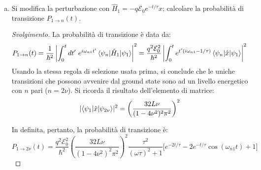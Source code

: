 \documentclass[11pt, a4paper]{scrartcl} %
\numberwithin{equation}{subsection}
\theoremstyle{style2}
\theoremstyle{style1}
\renewcommand\qedsymbol{$\blacksquare$}
\newenvironment{svolgimento}{\renewcommand\qedsymbol{$\spadesuit$}\begin{proof}[Svolgimento]}{\end{proof}}
\begin{document}
\begin{enumerate}[(a).]
\begin{svolgimento}
			Per il secondo ordine, invece, si calcola
			\[
			E^{(2)} _1 = \sum_{n>1}^{} \frac{\left\lvert \Braket{\psi _n(x)|\hat{H}_1|\psi _1(x)}  \right\rvert ^2}{E_1^{(0)} - E^{(0)} _n} 
			\] 
	Visto che $\psi _1(x)$ \`e pari, la regole di selezione per l'elemento di matrice \`e che sia $n$ pari, cos\`i il seno in $\psi _n(x)$ compensa la disparit\`a dell'integrando $x \psi _1(x)$.
	Allora la correzione al secondo ordine sar\`a della forma 
	\[
	E^{(2)} _1 = \sum_{\nu =1}^{+\infty}  \frac{\left\lvert \Braket{\psi _{2\nu } (x)|\hat{H}_1|\psi _1(x)}  \right\rvert ^2}{E_1^{(0)} - E^{(0)} _{2\nu } }
	\] 
Ciascun elemento di matrice, allora, si pu\`o calcolare com segue:
\[
\begin{split}
	\braket{\psi _1 |\hat{H}_1|\psi _{2\nu } }&= - q \mathcal{E}  \braket{\psi _1|\hat{x}|\psi _{2\nu } } = - \frac{q\mathcal{E} }{4 L} \int_{-L} ^{+L} dx \left[ e^{\frac{i \pi x}{2L}} + e^{- \frac{i\pi x}{2L}}  \right] x \left[ e^{\frac{i \pi x\nu }{L}} - e^{\frac{-i \pi x \nu }{L}}  \right] \\
						  &= (-1)^{\nu } q \mathcal{E} \frac{32i L \nu }{(1-4\nu ^2)^2 \pi^2}
\end{split}
\] 
Da questo, si pu\`o calcolare la correzione al secondo ordine, che ammette un risultato finito alla serie.
		\end{svolgimento}
	\item Si modifica la perturbazione con $\hat{H}_1 = -q \mathcal{E} _0 e^{-t / \tau } x$; calcolare la probabilit\`a di transizione $P_{1\to n} (t)$.
		\begin{svolgimento}
			   La probabilit\`a di transizione \`e data da:
			   \[
			   P_{1\to n}  (t) = \frac{1}{\hbar ^2} \left\lvert  \int_{0} ^t dt' \ e^{i\omega_{n1} t'} \braket{\psi _n |\hat{H}_1|\psi _1}  \right\rvert ^2 = \frac{q^2 \mathcal{E} _0^2}{\hbar ^2} \left\lvert \int_{0} ^t e^{t' (i\omega_{n1} -1 / \tau ) } \braket{\psi _n|\hat{x}|\psi _1}  \right\rvert ^2
			   \] 
			   Usando la stessa regola di selezione usata prima, si conclude che le uniche transizioni che possono avvenire dal ground state sono ad un livello energetico con $n$ pari ($n = 2\nu $).
			   Si ricorda il risultato dell'elemento di matrice:
			   \[
			   \lvert \braket{\psi _1|\hat{x}|\psi _{2\nu } }  \rvert ^2 = \left(\frac{32 L \nu }{(1-4\nu ^2)^2 \pi^2}\right) ^2
		   \] 


			  In definita, pertanto, la probabilit\`a di transizione \`e:
			  \begin{equation}
					  P_{1\to 2\nu } (t) = \frac{q^2 \mathcal{E} _0^2}{\hbar ^2}  \left(\frac{32 L \nu }{(1-4\nu ^2)^2 \pi^2}\right) ^2 \frac{\tau ^2}{(\omega\tau )^2 + 1} \Big[ e^{-2 t / \tau } - 2 e ^{-t / \tau } \cos(\omega_{n1} t)+ 1  \Big] 
			  \end{equation}
		\end{svolgimento}
\end{enumerate}
\end{document}
